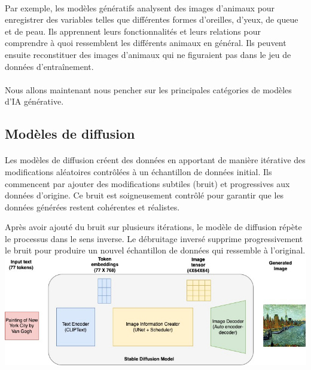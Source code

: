 \paragraph{}
Par exemple, les modèles génératifs analysent des images d'animaux pour enregistrer
des variables telles que différentes formes d'oreilles, d'yeux, de queue et de peau.
Ils apprennent leurs fonctionnalités et leurs relations pour comprendre à quoi
ressemblent les différents animaux en général. Ils peuvent ensuite reconstituer des
images d'animaux qui ne figuraient pas dans le jeu de données d'entraînement.

\paragraph{}
Nous allons maintenant nous pencher sur les principales catégories de modèles d'IA
générative.

\subsection{Modèles de diffusion}
\paragraph{}
Les modèles de diffusion créent des données en apportant de manière itérative des
modifications aléatoires contrôlées à un échantillon de données initial. Ils
commencent par ajouter des modifications subtiles (bruit) et progressives aux
données d'origine. Ce bruit est soigneusement contrôlé pour garantir que les données
générées restent cohérentes et réalistes.

Après avoir ajouté du bruit sur plusieurs itérations, le modèle de diffusion
répète le processus dans le sens inverse. Le débruitage inversé supprime progressivement
le bruit pour produire un nouvel échantillon de données qui ressemble à l'original.
\vspace{1cm}
\includegraphics[width=\textwidth]{images/modelsdiffusion.jpg}
\vspace{1cm}

